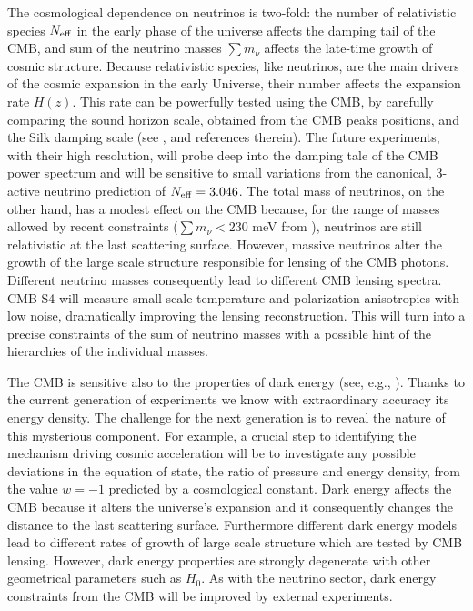 \documentclass[aps,prd,reprint,superscriptaddress]{revtex4-1}
\begin{document}
The cosmological dependence on neutrinos is two-fold: the number of relativistic species $N_{\rm eff}$ in the early phase of the universe affects the damping tail of the CMB, and sum of the neutrino masses $\sum m_\nu$ affects the late-time growth of cosmic structure.
Because relativistic species, like neutrinos, are the main drivers of the cosmic expansion in the early Universe, their number affects the expansion rate $H(z)$. This rate can be powerfully tested using the CMB, by carefully comparing the sound horizon scale, obtained from the CMB peaks positions, and the Silk damping scale (see \cite{2013arXiv1309.5383A}, \cite{2013PhRvD..87h3008H} and references therein). 
The future experiments, with their high resolution, will probe deep into the damping tale of the CMB power spectrum and will be sensitive to small variations from the canonical, 3-active neutrino prediction of $N_{\rm eff}=3.046$. The total mass of neutrinos, on the other hand, has a modest effect on the CMB because, for the range of masses allowed by recent constraints ($\sum m_{\nu}<230$ meV from \cite{planck-collaboration:2014}), neutrinos are still relativistic at the last scattering surface. However, massive neutrinos alter the growth of the large scale structure responsible for lensing of the CMB photons. Different neutrino masses consequently lead to different CMB lensing spectra. CMB-S4 will measure small scale temperature and polarization anisotropies with low noise, dramatically improving the lensing reconstruction. This will turn into a precise constraints of the sum of neutrino masses with a possible hint of the hierarchies of the individual masses.

The CMB is sensitive also to the properties of dark energy (see, e.g., \cite{2010MNRAS.405.2639J}). Thanks to the current generation of experiments we know with extraordinary accuracy its energy density. The challenge for the next generation is to reveal the nature of this mysterious component. For example, a crucial step to identifying the mechanism driving cosmic acceleration will be to investigate any possible deviations in the equation of state, the ratio of pressure and energy density, from the value $w=-1$ predicted by a cosmological constant. 
Dark energy affects the CMB because it alters the universe's expansion and it consequently changes the distance to the last scattering surface. Furthermore different dark energy models lead to different rates of growth of large scale structure which are tested by CMB lensing. 
However, dark energy properties are strongly degenerate with other geometrical parameters such as $H_{0}$. As with the neutrino sector, dark energy constraints from the CMB 
will be improved by external experiments.
\end{document}
